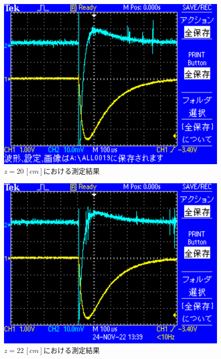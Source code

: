 \begin{figure}[H]
    \centering
    \includegraphics[scale=0.5]{images-11.pdf}
    \caption{$z=20\,[cm]$における測定結果}
\end{figure}

\begin{figure}[H]
    \centering
    \includegraphics[scale=0.5]{images-12.pdf}
    \caption{$z=22\,[cm]$における測定結果}
\end{figure}

